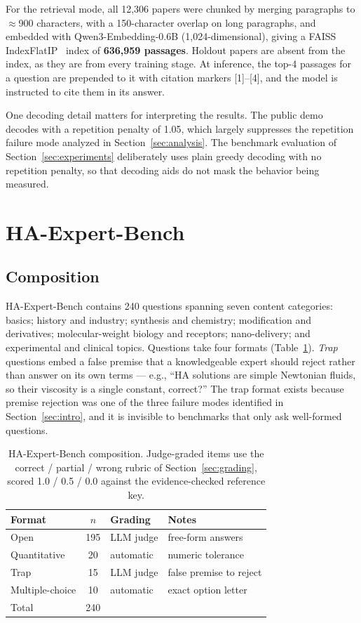 \documentclass[11pt]{article}
\begin{document}
For the retrieval mode, all 12,306 papers were chunked by merging
paragraphs to $\approx$900 characters, with a 150-character overlap on
long paragraphs, and embedded with Qwen3-Embedding-0.6B
(1,024-dimensional), giving a FAISS IndexFlatIP~\cite{faiss} index of
\textbf{636,959 passages}. Holdout papers are absent from the index, as
they are from every training stage. At inference, the top-4 passages for
a question are prepended to it with citation markers [1]--[4], and the
model is instructed to cite them in its answer.

One decoding detail matters for interpreting the results. The public demo
decodes with a repetition penalty of 1.05, which largely suppresses the
repetition failure mode analyzed in Section~\ref{sec:analysis}. The
benchmark evaluation of Section~\ref{sec:experiments} deliberately uses
plain greedy decoding with no repetition penalty, so that decoding aids do
not mask the behavior being measured.

\section{HA-Expert-Bench}
\label{sec:bench}

\subsection{Composition}

HA-Expert-Bench contains 240 questions spanning seven content categories:
basics; history and industry; synthesis and chemistry; modification and
derivatives; molecular-weight biology and receptors; nano-delivery; and
experimental and clinical topics. Questions take four formats
(Table~\ref{tab:benchcomp}). \emph{Trap} questions embed a false premise
that a knowledgeable expert should reject rather than answer on its own
terms --- e.g., ``HA solutions are simple Newtonian fluids, so their
viscosity is a single constant, correct?'' The trap format exists because
premise rejection was one of the three failure modes identified in
Section~\ref{sec:intro}, and it is invisible to benchmarks that only ask
well-formed questions.

\begin{table}[t]
\centering
\begin{tabular}{lcll}
\toprule
Format & $n$ & Grading & Notes \\
\midrule
Open & 195 & LLM judge & free-form answers \\
Quantitative & 20 & automatic & numeric tolerance \\
Trap & 15 & LLM judge & false premise to reject \\
Multiple-choice & 10 & automatic & exact option letter \\
\midrule
Total & 240 & & \\
\bottomrule
\end{tabular}
\caption{HA-Expert-Bench composition. Judge-graded items use the
correct / partial / wrong rubric of Section~\ref{sec:grading}, scored
1.0 / 0.5 / 0.0 against the evidence-checked reference key.}
\label{tab:benchcomp}
\end{table}
\end{document}
